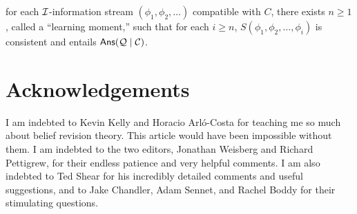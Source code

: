 		\im[(2)] for each $\cal I$-information stream $(\phi_1, \phi_2, \ldots)$ compatible with $C$, there exists $n \ge 1$, called a ``learning moment,'' such that for each $i\ge n$, $S(\phi_1, \phi_2, \ldots, \phi_i)$ is consistent and entails $\mathsf{Ans}({\cal Q} \mid {\cal C})$.
	\ed
\ed   



\section*{Acknowledgements}

I am indebted to Kevin Kelly and Horacio Arl\'{o}-Costa for teaching me so much about belief revision theory. This article would have been impossible without them. I am indebted to the two editors, Jonathan Weisberg and Richard Pettigrew, for their endless patience and very helpful comments. I am also indebted to Ted Shear for his incredibly detailed comments and useful suggestions, and to Jake Chandler, Adam Sennet, and Rachel Boddy for their stimulating questions.